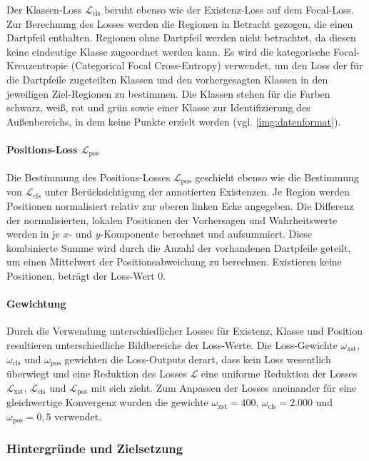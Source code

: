 Der Klassen-Loss $\mathcal{L}_\text{cls}$ beruht ebenso wie der Existenz-Loss auf dem Focal-Loss. Zur Berechnung des Losses werden die Regionen in Betracht gezogen, die einen Dartpfeil enthalten. Regionen ohne Dartpfeil werden nicht betrachtet, da diesen keine eindeutige Klasse zugeordnet werden kann. Es wird die kategorische Focal-Kreuzentropie (Categorical Focal Cross-Entropy) \cite{focal_loss} verwendet, um den Loss der für die Dartpfeile zugeteilten Klassen und den vorhergesagten Klassen in den jeweiligen Ziel-Regionen zu bestimmen. Die Klassen stehen für die Farben schwarz, weiß, rot und grün sowie einer Klasse zur Identifizierung des Außenbereichs, in dem keine Punkte erzielt werden (vgl. \autoref{img:datenformat}).

\paragraph{Positions-Loss $\mathcal{L}_\text{pos}$}

Die Bestimmung des Positions-Losses $\mathcal{L}_\text{pos}$ geschieht ebenso wie die Bestimmung von $\mathcal{L}_\text{cls}$ unter Berücksichtigung der annotierten Existenzen. Je Region werden Positionen normalisiert relativ zur oberen linken Ecke angegeben. Die Differenz der normalisierten, lokalen Positionen der Vorhersagen und Wahrheitswerte werden in je $x$- und $y$-Komponente berechnet und aufsummiert. Diese kombinierte Summe wird durch die Anzahl der vorhandenen Dartpfeile geteilt, um einen Mittelwert der Positionsabweichung zu berechnen. Existieren keine Positionen, beträgt der Loss-Wert 0.

\paragraph{Gewichtung}

Durch die Verwendung unterschiedlicher Losses für Existenz, Klasse und Position resultieren unterschiedliche Bildbereiche der Loss-Werte. Die Loss-Gewichte $\omega_\text{xst}$, $\omega_\text{cls}$ und $\omega_\text{pos}$ gewichten die Loss-Outputs derart, dass kein Loss wesentlich überwiegt und eine Reduktion des Losses $\mathcal{L}$ eine uniforme Reduktion der Losses $\mathcal{L}_\text{xst}$, $\mathcal{L}_\text{cls}$ und $\mathcal{L}_\text{pos}$ mit sich zieht. Zum Anpassen der Losses aneinander für eine gleichwertige Konvergenz wurden die gewichte $\omega_\text{xst} = 400$, $\omega_\text{cls} = 2.000$ und $\omega_\text{pos} = 0,5$ verwendet.

\subsubsection{Hintergründe und Zielsetzung}


